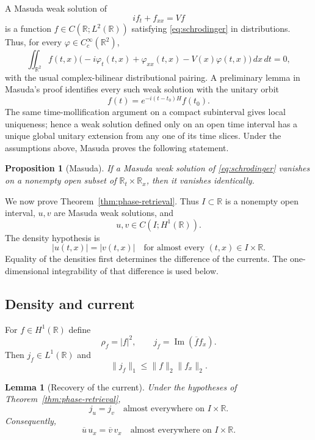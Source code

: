 \documentclass[11pt]{amsart}
\newtheorem{proposition}[theorem]{Proposition}
\newtheorem{lemma}[theorem]{Lemma}
\numberwithin{equation}{section}
\theoremstyle{remark}
\newcommand{\R}{\mathbb R}
\begin{document}
A Masuda weak solution of
\begin{equation}
 if_t+f_{xx}=Vf
 \label{eq:schrodinger}
\end{equation}
is a function $f\in C(\R;L^2(\R))$ satisfying
\eqref{eq:schrodinger} in distributions.  Thus, for every
$\varphi\in C_c^\infty(\R^2)$,
\[
 \iint_{\R^2}f(t,x)
 \bigl(-i\varphi_t(t,x)+\varphi_{xx}(t,x)-V(x)\varphi(t,x)\bigr)
 \,dx\,dt=0,
\]
with the usual complex-bilinear distributional pairing.  A preliminary lemma
in Masuda's proof identifies every such weak solution with the unitary orbit
\[
 f(t)=e^{-i(t-t_0)H}f(t_0).
\]
The same time-mollification argument on a compact subinterval gives local
uniqueness; hence a weak solution defined only on an open time interval has a
unique global unitary extension from any one of its time slices.  Under the
assumptions above, Masuda proves the following statement.

\begin{proposition}[Masuda]
\label{prop:masuda}
If a Masuda weak solution of \eqref{eq:schrodinger} vanishes on a nonempty
open subset of $\R_t\times\R_x$, then it vanishes identically.
\end{proposition}

We now prove Theorem~\ref{thm:phase-retrieval}.  Thus $I\subset\R$ is a
nonempty open interval, $u,v$ are Masuda weak solutions, and
\begin{equation}
 u,v\in C(I;H^1(\R)).
 \label{eq:H1-regularity}
\end{equation}
The density hypothesis is
\begin{equation}
 |u(t,x)|=|v(t,x)|
 \quad\text{for almost every }(t,x)\in I\times\R.
 \label{eq:modulus}
\end{equation}
Equality of the densities first determines the difference of the currents.
The one-dimensional integrability of that difference is used below.

\subsection{Density and current}

For $f\in H^1(\R)$ define
\[
 \rho_f=|f|^2,
 \qquad
 j_f=\operatorname{Im}(\overline f f_x).
\]
Then $j_f\in L^1(\R)$ and
\[
 \|j_f\|_1\le \|f\|_2\|f_x\|_2.
\]

\begin{lemma}[Recovery of the current]
\label{lem:current}
Under the hypotheses of Theorem~\ref{thm:phase-retrieval},
\begin{equation}
 j_u=j_v
 \quad\text{almost everywhere on }I\times\R.
 \label{eq:equal-current}
\end{equation}
Consequently,
\begin{equation}
 \overline u\,u_x=\overline v\,v_x
 \quad\text{almost everywhere on }I\times\R.
 \label{eq:equal-logarithmic-derivative}
\end{equation}
\end{lemma}
\end{document}
